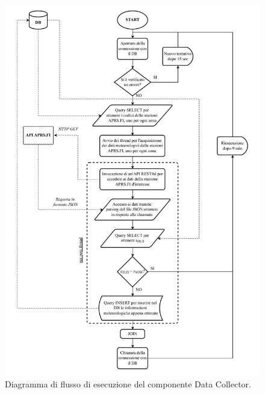 \begin{figure}[h!]
	\centering
	\includegraphics[width=1\linewidth]{./Iterazione 3/OtherFiles/FC - data collector}
	\caption{Diagramma di flusso di esecuzione del componente Data Collector.}
	\label{fig:DCFlowChart}
\end{figure}